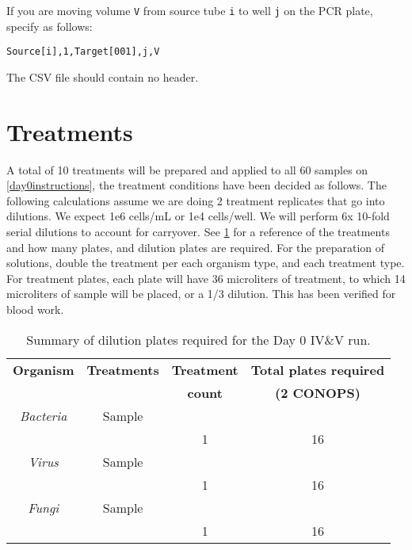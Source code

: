 \documentclass{article}
\begin{document}
If you are moving volume \texttt{V} from source tube \texttt{i} to well \texttt{j} on the PCR plate, specify as follows: 

\texttt{Source[i],1,Target[001],j,V}

The CSV file should contain no header.

\section{Treatments} \label{treatments}
A total of 10 treatments will be prepared and applied to all 60 samples on  \ref{day0instructions}, the treatment conditions have been decided as follows. The following calculations assume we are doing 2 treatment replicates that go into dilutions. We expect 1e6 cells/mL or 1e4 cells/well. We will perform 6x 10-fold serial dilutions to account for carryover. See \ref{tab:dilution-plan-day-0} for a reference of the treatments and how many plates, and dilution plates are required. For the preparation of solutions, double the treatment per each organism type, and each treatment type. For treatment plates, each plate will have 36 microliters of treatment, to which 14 microliters of sample will be placed, or a 1/3 dilution. This has been verified for blood work.

\begin{table} 
  \centering
  \begin{tabular}[]{c|c|c|c}
    \textbf{Organism} & \textbf{Treatments} & \textbf{Treatment} & \textbf{Total plates required} \\
     &  & \textbf{count} & \textbf{(2 CONOPS)} \\
    \hline
    \textit{Bacteria} & Sample  & & \\
    \hline
    & & 1 & 16\\
    \hline
    \textit{Virus} & Sample  & & \\
    \hline
    & & 1 & 16\\
    \hline
    \textit{Fungi} & Sample  & & \\
    \hline
    & & 1 & 16\\
    \hline

  \end{tabular}
  \caption{Summary of dilution plates required for the Day 0 IV\&V run.}
  \label{tab:dilution-plan-day-0}
\end{table}
\end{document}
